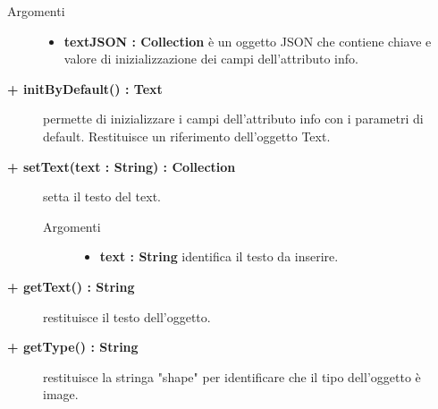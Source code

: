 \begin{description}
\begin{description}
		\begin{description}
			\item[Argomenti] \hfill
				\begin{itemize}
				
					\item \textbf{textJSON : Collection			} \hfill
					è un oggetto JSON che contiene chiave e valore di inizializzazione dei campi dell'attributo info. 
				\end{itemize}
		\end{description}

\end{description}

\begin{description}
		\item[\textbf{\color{blue}+ initByDefault() : Text			}] \hfill
			permette di inizializzare i campi dell'attributo info con i parametri di default. Restituisce un riferimento dell'oggetto Text. 

\end{description}

\begin{description}
		\item[\textbf{\color{blue}+ setText(text : String) : Collection			}] \hfill
			setta il testo del text.
			
		\begin{description}
			\item[Argomenti] \hfill
				\begin{itemize}
				
					\item \textbf{text : String			} \hfill
					identifica il testo da inserire.
				\end{itemize}
		\end{description}

\end{description}

\begin{description}
		\item[\textbf{\color{blue}+ getText() : String			}] \hfill
			restituisce il testo dell'oggetto. 

\end{description}

\begin{description}
		\item[\textbf{\color{blue}+ getType() : String			}] \hfill
			restituisce la stringa "shape" per identificare che il tipo dell'oggetto è image. 

\end{description}



\end{description}










